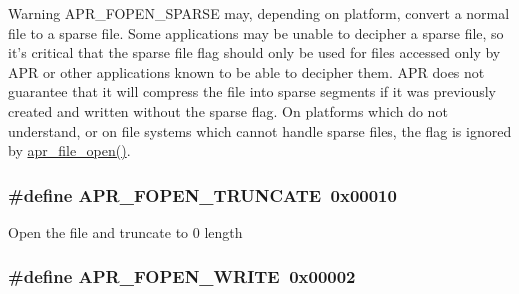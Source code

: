 \begin{DoxyWarning}{Warning}
A\-P\-R\-\_\-\-F\-O\-P\-E\-N\-\_\-\-S\-P\-A\-R\-S\-E may, depending on platform, convert a normal file to a sparse file. Some applications may be unable to decipher a sparse file, so it's critical that the sparse file flag should only be used for files accessed only by A\-P\-R or other applications known to be able to decipher them. A\-P\-R does not guarantee that it will compress the file into sparse segments if it was previously created and written without the sparse flag. On platforms which do not understand, or on file systems which cannot handle sparse files, the flag is ignored by \hyperlink{group__apr__file__io_gabda14cbf242fb4fe99055434213e5446}{apr\-\_\-file\-\_\-open()}. 
\end{DoxyWarning}
\hypertarget{group__apr__file__open__flags_ga09b05a5bd5db534b93794f7657bcb146}{
\subsubsection[{A\-P\-R\-\_\-\-F\-O\-P\-E\-N\-\_\-\-T\-R\-U\-N\-C\-A\-T\-E}]{\setlength{\rightskip}{0pt plus 5cm}\#define A\-P\-R\-\_\-\-F\-O\-P\-E\-N\-\_\-\-T\-R\-U\-N\-C\-A\-T\-E~0x00010}}\label{group__apr__file__open__flags_ga09b05a5bd5db534b93794f7657bcb146}
Open the file and truncate to 0 length \hypertarget{group__apr__file__open__flags_gac598bb95fc9476b0bf2ed0b1c308842c}{
\subsubsection[{A\-P\-R\-\_\-\-F\-O\-P\-E\-N\-\_\-\-W\-R\-I\-T\-E}]{\setlength{\rightskip}{0pt plus 5cm}\#define A\-P\-R\-\_\-\-F\-O\-P\-E\-N\-\_\-\-W\-R\-I\-T\-E~0x00002}}\label{group__apr__file__open__flags_gac598bb95fc9476b0bf2ed0b1c308842c}

